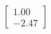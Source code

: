 \documentclass[preview]{standalone}
\begin{document}
\begin{align*}
\begin{bmatrix} 1.00 \\ -2.47 \end{bmatrix}
\end{align*}
\end{document}
